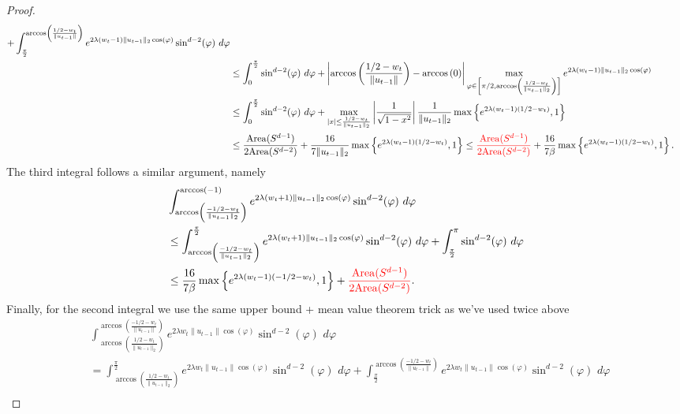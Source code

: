 \documentclass[journal,onecolumn,11pt,final]{IEEEtran}
\newcommand{\1}{\mathbb{1}}
\theoremstyle{plain}
\theoremstyle{definition}
\theoremstyle{plain}
\theoremstyle{plain}
\theoremstyle{definition}
\newcommand{\red}[1]{\textcolor{red}{#1}}
\begin{document}
\begin{proof}
\begin{align*}
			+ \int_{\frac{\pi}{2}}^{ \arccos\left(\frac{1/2-w_t}{\|u_{t-1}\|}\right)}	e^{2\lambda (w_t - 1) \|u_{t-1}\|_2 \cos(\varphi)} \sin^{d-2}(\varphi) \,\, d\varphi \\
			&\leq \int_{0}^{\frac{\pi}{2}} \sin^{d-2}(\varphi) \,\, d\varphi + \left| \arccos\left( \frac{1/2-w_t}{\|u_{t-1}\|} \right) - \arccos\left( 0 \right) \right|\max_{\varphi \in \left[\pi/2, \arccos\left(\frac{1/2-w_t}{\|u_{t-1}\|_2}\right)\right]} e^{2\lambda (w_t - 1) \|u_{t-1}\|_2 \cos(\varphi)}\\
			&\leq \int_{0}^{\frac{\pi}{2}} \sin^{d-2}(\varphi) \,\, d\varphi 
			+ \max_{|x| \leq  \frac{1/2 - w_t}{\|u_{t-1}\|_2}} \left| \frac{1}{\sqrt{1-x^2}} \right|  \frac{1}{\|u_{t-1}\|_2} \max\left\{e^{2\lambda (w_t - 1)(1/2-w_t)}, 1\right\}\\
			&\leq \frac{\mathrm{Area}(S^{d-1})}{2\mathrm{Area}(S^{d-2})} + \frac{16}{7\|u_{t-1}\|_2}  \max\left\{e^{2\lambda (w_t - 1)(1/2-w_t)}, 1\right\} \leq \red{\frac{\mathrm{Area}(S^{d-1})}{2\mathrm{Area}(S^{d-2})}} + \frac{16}{7\beta} \max\left\{e^{2\lambda (w_t - 1)(1/2-w_t)}, 1\right\}.
		\end{align*}
		The third integral follows a similar argument, namely
		\begin{align*}
			&\int_{\arccos\left(\frac{-1/2 - w_t}{\|u_{t-1}\|_2}\right)}^{\arccos(-1)} e^{2\lambda (w_t + 1) \|u_{t-1}\|_2 \cos(\varphi)} \sin^{d-2}(\varphi)\,\,d\varphi \\
			& \leq \int_{\arccos\left(\frac{-1/2 - w_t}{\|u_{t-1}\|_2}\right)}^{\frac{\pi}{2}} e^{2\lambda (w_t + 1) \|u_{t-1}\|_2 \cos(\varphi)} \sin^{d-2}(\varphi)\,\,d\varphi + \int_{\frac{\pi}{2}}^{\pi} \sin^{d-2}(\varphi)\,\,d\varphi\\
			&\leq \frac{16}{7\beta}  \max\left\{e^{2\lambda (w_t - 1)(-1/2-w_t)}, 1\right\} + \red{\frac{\mathrm{Area}(S^{d-1})}{2\mathrm{Area}(S^{d-2})}}.
		\end{align*}
		Finally, for the second integral we use the same upper bound + mean value theorem trick as we've used twice above
		\begin{align*}
			& \int_{\arccos\left(\frac{1/2 - w_t}{\|u_{t-1}\|_2}\right)}^{\arccos\left(\frac{-1/2-w_t}{\|u_{t-1}\|}\right)} e^{2\lambda w_t \|u_{t-1}\| \cos(\varphi)} \sin^{d-2}(\varphi) \,\, d\varphi\\
			&= \int_{\arccos\left(\frac{1/2 - w_t}{\|u_{t-1}\|_2}\right)}^{\frac{\pi}{2}} e^{2\lambda w_t \|u_{t-1}\| \cos(\varphi)} \sin^{d-2}(\varphi) \,\, d\varphi + \int_{\frac{\pi}{2}}^{\arccos\left(\frac{-1/2-w_t}{\|u_{t-1}\|}\right)} e^{2\lambda w_t \|u_{t-1}\| \cos(\varphi)} \sin^{d-2}(\varphi) \,\, d\varphi\\

\end{align*}
\end{proof}
\end{document}
